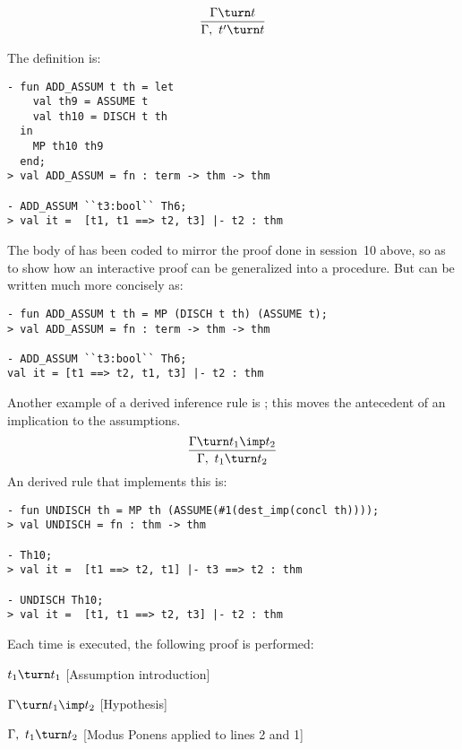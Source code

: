 \[ \frac{\Gamma\turn t}{\Gamma,\ t'\turn t} \]

\noindent The \ML{} definition is:

\begin{session}
\begin{verbatim}
- fun ADD_ASSUM t th = let
    val th9 = ASSUME t
    val th10 = DISCH t th
  in
    MP th10 th9
  end;
> val ADD_ASSUM = fn : term -> thm -> thm

- ADD_ASSUM ``t3:bool`` Th6;
> val it =  [t1, t1 ==> t2, t3] |- t2 : thm
\end{verbatim}
\end{session}

\noindent The body of  has been coded  to mirror  the proof done
in session~10 above, so as to show how an interactive proof can be
generalized into a procedure.  But  can be written much
more concisely as:

\begin{session}
\begin{verbatim}
- fun ADD_ASSUM t th = MP (DISCH t th) (ASSUME t);
> val ADD_ASSUM = fn : term -> thm -> thm

- ADD_ASSUM ``t3:bool`` Th6;
val it = [t1 ==> t2, t1, t3] |- t2 : thm
\end{verbatim}
\end{session}

Another example of a derived inference rule is ; this moves the antecedent of an implication to the assumptions.
\[
\frac{\Gamma\turn t_1\imp t_2}{\Gamma,\ t_1\turn t_2}
\]
An \ML{} derived rule that implements this is:


\begin{session}
\begin{verbatim}
- fun UNDISCH th = MP th (ASSUME(#1(dest_imp(concl th))));
> val UNDISCH = fn : thm -> thm

- Th10;
> val it =  [t1 ==> t2, t1] |- t3 ==> t2 : thm

- UNDISCH Th10;
> val it =  [t1, t1 ==> t2, t3] |- t2 : thm
\end{verbatim}
\end{session}

\noindent Each time  is executed,
the following proof is performed:

\begin{proofenumerate}
\item $ t_1\turn t_1$ \hfill [Assumption introduction]
\item $ \Gamma\turn t_1\imp t_2$ \hfill [Hypothesis]
\item $ \Gamma,\ t_1\turn t_2$ \hfill [Modus Ponens applied to lines 2 and 1]
\end{proofenumerate}

